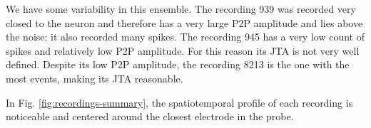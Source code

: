 \documentclass{report}
\begin{document}
We have some variability in this ensemble. 
The recording 939 was recorded very closed to the neuron and therefore has a very large P2P amplitude and lies above the noise; it also recorded many spikes. 
The recording 945 has a very low count of spikes and relatively low P2P amplitude. For this reason its JTA is not very well defined.
Despite its low P2P amplitude, the recording 8213 is the one with the most events, making its JTA reasonable.

In Fig. \ref{fig:recordings-summary}, the spatiotemporal profile of each recording is noticeable and centered around the closest electrode in the probe.
\end{document}
